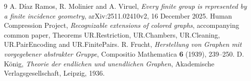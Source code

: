\begin{thebibliography}{9}
 A. D\'iaz Ramos, R. Molinier and A. Viruel,
\emph{Every finite group is represented by a finite incidence geometry},
arXiv:2511.02410v2, 16 December 2025.
 Human Compression Project,
\emph{Recognizable extensions of colored graphs}, accompanying common paper,
Theorems UR.Restriction, UR.Chambers, UR.Cleaning, UR.PairEncoding and
UR.FinitePairs.
 R. Frucht, \emph{Herstellung von Graphen mit vorgegebener
abstrakter Gruppe}, Compositio Mathematica \textbf{6} (1939), 239--250.
 D. K\"onig, \emph{Theorie der endlichen und unendlichen Graphen},
Akademische Verlagsgesellschaft, Leipzig, 1936.
\end{thebibliography}
